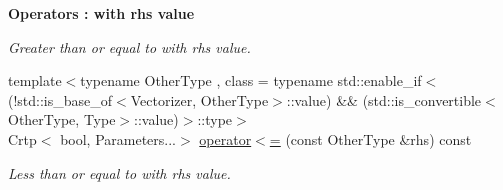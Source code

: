 \begin{Indent}{\bf Operators \-: with rhs value}
\begin{DoxyCompactItemize}
\begin{DoxyCompactList}\small\item\em Greater than or equal to with rhs value. \end{DoxyCompactList}\item 
{\footnotesize template$<$typename Other\-Type , class  = typename std\-::enable\-\_\-if$<$(!std\-::is\-\_\-base\-\_\-of$<$\-Vectorizer, Other\-Type$>$\-::value) \&\& (std\-::is\-\_\-convertible$<$\-Other\-Type, Type$>$\-::value)$>$\-::type$>$ }\\Crtp$<$ bool, Parameters...$>$ \hyperlink{classmagrathea_1_1StaticVectorizer_a4c967db7cc9d968dfc7eeb8fc4570f59}{operator$<$=} (const Other\-Type \&rhs) const 
\begin{DoxyCompactList}\small\item\em Less than or equal to with rhs value. \end{DoxyCompactList}\end{DoxyCompactItemize}
\end{Indent}

